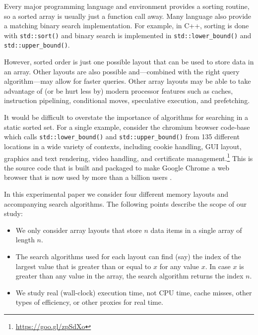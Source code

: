 \documentclass{patmorin}
\begin{document}
Every major programming language and environment provides a sorting
routine, so a sorted array is usually just a function call away. Many
language also provide a matching binary search implementation.
For example, in C++, sorting is done with \texttt{std::sort()}
and binary search is implemented in \texttt{std::lower_bound()}
and \texttt{std::upper_bound()}.

However, sorted order is just one possible layout that can be used to
store data in an array. Other layouts are also possible and---combined
with the right query algorithm---may allow for faster queries.
Other array layouts may be able to take advantage of (or be hurt less
by) modern processor features such as caches, instruction pipelining,
conditional moves, speculative execution, and prefetching.

It would be difficult to overstate the importance of
algorithms for searching in a static sorted set.  For a
single example, consider the chromium browser code-base
which calls \texttt{std::lower_bound()} and
\texttt{std::upper_bound()} from 135 different locations
in a wide variety of contexts, including cookie handling, GUI
layout, graphics and text rendering, video handling, and certificate
management.\footnote{\url{https://goo.gl/zpSdXo}} This is the source code
that is built and packaged to make Google Chrome a web browser that is
now used by more than a billion users \cite{protalinksi:google}.


In this experimental paper we consider four different memory layouts and
accompanying search algorithms.  The following points describe the scope of our study:

\begin{itemize}
\item We only consider array layouts that store $n$ data items in a
      single array of length $n$.

\item The search algorithms used for each layout can find (say) the
      index of the largest value that is greater than or equal to $x$
      for any value $x$. In case $x$ is greater than any value in the
      array, the search algorithm returns the index $n$.

\item We study real (wall-clock) execution time, not CPU time, cache
      misses, other types of efficiency, or other proxies for real time.
\end{itemize}
\end{document}
